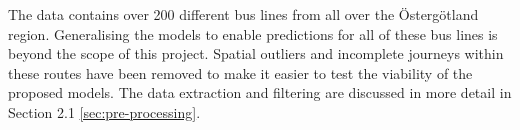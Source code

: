 The data contains over 200 different bus lines from all over the Östergötland region. Generalising the models to enable predictions for all of these bus lines is beyond the scope of this project. Spatial outliers and incomplete journeys within these routes have been removed to make it easier to test the viability of the proposed models. The data extraction and filtering are discussed in more detail in Section 2.1 \ref{sec:pre-processing}.




